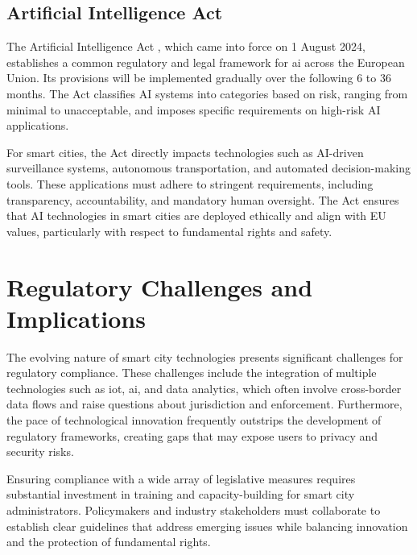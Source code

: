 \subsection{Artificial Intelligence Act}

The Artificial Intelligence Act \autocite{eu-1689-2024}, which came into force on 1 August 2024, establishes a common regulatory and legal framework for \gls{ai} across the European Union. Its provisions will be implemented gradually over the following 6 to 36 months. The Act classifies AI systems into categories based on risk, ranging from minimal to unacceptable, and imposes specific requirements on high-risk AI applications.

For smart cities, the Act directly impacts technologies such as AI-driven surveillance systems, autonomous transportation, and automated decision-making tools. These applications must adhere to stringent requirements, including transparency, accountability, and mandatory human oversight. The Act ensures that AI technologies in smart cities are deployed ethically and align with EU values, particularly with respect to fundamental rights and safety.

\section{Regulatory Challenges and Implications}

The evolving nature of smart city technologies presents significant challenges for regulatory compliance. These challenges include the integration of multiple technologies such as \gls{iot}, \gls{ai}, and data analytics, which often involve cross-border data flows and raise questions about jurisdiction and enforcement. Furthermore, the pace of technological innovation frequently outstrips the development of regulatory frameworks, creating gaps that may expose users to privacy and security risks.

Ensuring compliance with a wide array of legislative measures requires substantial investment in training and capacity-building for smart city administrators. Policymakers and industry stakeholders must collaborate to establish clear guidelines that address emerging issues while balancing innovation and the protection of fundamental rights.


